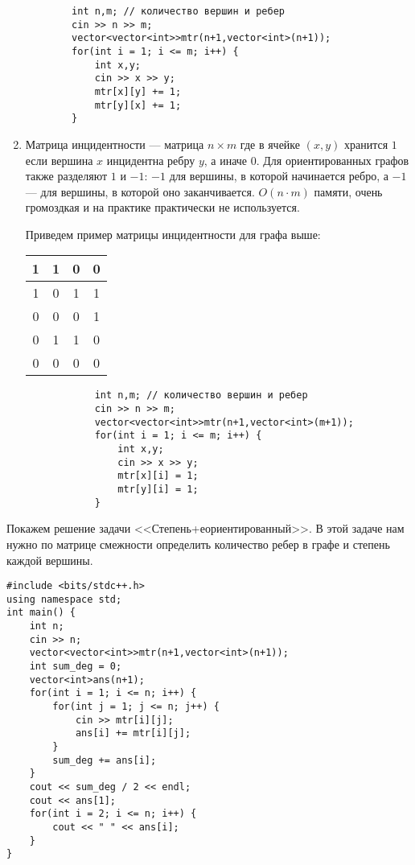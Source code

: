 \documentclass{article}
\begin{document}
\begin{enumerate}
    \begin{verbatim}
        int n,m; // количество вершин и ребер
        cin >> n >> m;
        vector<vector<int>>mtr(n+1,vector<int>(n+1));
        for(int i = 1; i <= m; i++) {
            int x,y;
            cin >> x >> y;
            mtr[x][y] += 1;
            mtr[y][x] += 1;
        }
    \end{verbatim}
    
    \item Матрица инцидентности --- матрица $n \times m$ где в ячейке $(x, y)$ хранится $1$ если вершина $x$ инцидентна ребру $y$, а иначе $0$. Для ориентированных графов также разделяют $1$ и $-1$: $-1$ для вершины, в которой начинается ребро, а $-1$ --- для вершины, в которой оно заканчивается. $O(n \cdot m)$ памяти, очень громоздкая и на практике практически не используется.
    
    \begin{center}
        Приведем пример матрицы инцидентности для графа выше:
        
         \begin{tabular}{ |c|c|c|c| } 
         \hline
         1 & 1 & 0 & 0  \\ 
         \hline
         1 & 0 & 1 & 1   \\
         \hline
         0 & 0 & 0 & 1   \\
         \hline
         0 & 1 & 1 & 0  \\
         \hline
         0 & 0 & 0 & 0   \\
         \hline
        \end{tabular}
    \end{center}
        \begin{verbatim}
            int n,m; // количество вершин и ребер
            cin >> n >> m;
            vector<vector<int>>mtr(n+1,vector<int>(m+1));
            for(int i = 1; i <= m; i++) {
                int x,y;
                cin >> x >> y;
                mtr[x][i] = 1;
                mtr[y][i] = 1;
            }
        \end{verbatim}

\end{enumerate}

Покажем решение задачи <<Степень+еориентированный>>. 
В этой задаче нам нужно по матрице смежности определить количество ребер в графе и степень каждой вершины.
\begin{verbatim}
#include <bits/stdc++.h>
using namespace std;
int main() {
    int n;
    cin >> n;
    vector<vector<int>>mtr(n+1,vector<int>(n+1));
    int sum_deg = 0;
    vector<int>ans(n+1);
    for(int i = 1; i <= n; i++) {
        for(int j = 1; j <= n; j++) {
            cin >> mtr[i][j];
            ans[i] += mtr[i][j];
        }
        sum_deg += ans[i];
    }
    cout << sum_deg / 2 << endl;
    cout << ans[1];
    for(int i = 2; i <= n; i++) {
        cout << " " << ans[i];
    }
}
        \end{verbatim}
\end{document}
